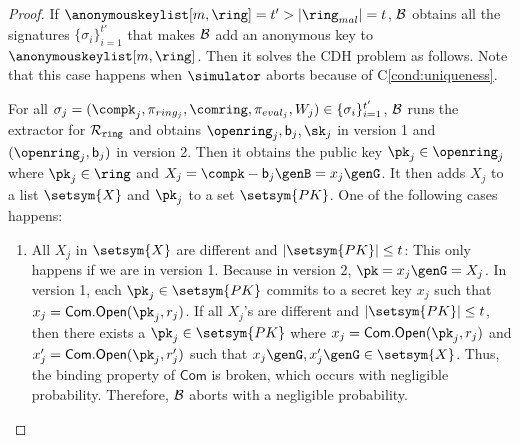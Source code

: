 \begin{proof}
	If $ \anonymouskeylist[m,\ring] =t' > |\ring_{mal}| =t$, $ \mathcal{B} $ obtains all the signatures $ \{\sigma_i\}_{i =1}^{t'} $ that makes $ \mathcal{B} $ add an anonymous key to $ \anonymouskeylist[m,\ring] $. Then it solves the CDH problem as follows. Note that this case happens when $ \simulator $ aborts because of C\ref{cond:uniqueness}.
	
	For all $ \sigma_j =(\compk_j,\pi_{ring_j},\comring, \pi_{eval_j},W_j) \in \{\sigma_i\}_{i =1}^{t'} $, $ \mathcal{B} $ runs the extractor for $ \mathcal{R}_{\mathtt{ring}} $ and obtains $\openring_j, \openpk_j, \sk_j$ in version 1 and $ (\openring_j, \openpk_j) $ in version 2. Then it obtains the public key $ \pk_j \in \openring_j$ where $ \pk_j \in \ring $ and  $ X_j = \compk- \openpk_j \genB = x_j \genG $.
	It then adds $ X_j $ to a list $ \setsym{X}  $ and $ \pk_j $ to a set $ \setsym{PK} $. One of the following cases happens:
	
	\begin{enumerate}
		
		\item All $ X_j $ in $ \setsym{X} $ are different  and $ |\setsym{PK}| \leq t $:  This only happens if we are in version 1. Because in version 2, $ \pk = x_j \genG = X_j$. In version 1, each $ \pk_j \in \setsym{PK} $ commits to a secret key $ x_j $ such that $ x_j = \mathsf{Com}.\mathsf{Open}(\pk_j, r_j) $. If all $ X_j $'s are different and  $ |\setsym{PK}| \leq t $, then there exists a $ \pk_j \in \setsym{PK} $ where $ x_j = \mathsf{Com}.\mathsf{Open}(\pk_j, r_j) $ and $ x'_j = \mathsf{Com}.\mathsf{Open}(\pk_j, r'_j) $ such that $ x_j \genG, x_j'\genG \in \setsym{X} $. Thus, the binding property of $ \mathsf{Com} $ is broken, which occurs with negligible probability. Therefore, $ \mathcal{B}  $ aborts with a negligible probability. 
		

\end{enumerate}
\end{proof}
